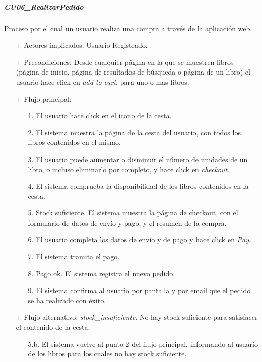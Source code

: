 \documentclass[a4paper]{article}
\begin{document}
            \subparagraph{CU06\_RealizarPedido}
                Proceso por el cual un usuario realiza una compra a través de la aplicación web.
                \begin{itemize}
                    \item[+] Actores implicados: Usuario Registrado.
                    \item[+] Precondiciones: Desde cualquier página en la que se muestren libros (página de inicio, página de resultados de búsqueda o página de un libro) el usuario hace click en \emph{add to cart}, para uno o mas libros.
                    \item[+] Flujo principal:
                    \begin{enumerate}
                        \item[1.] El usuario hace click en el icono de la cesta.
                        \item[2.] El sistema muestra la página de la cesta del usuario, con todos los libros contenidos en el mismo.
                        \item[3.] El usuario puede aumentar o disminuir el número de unidades de un libro, o incluso eliminarlo por completo, y hace click en \emph{checkout}.
                        \item[4.] El sistema comprueba la disponibilidad de los libros contenidos en la cesta.
                        \item[5.] Stock suficiente. El sistema muestra la página de checkout, con el formulario de datos de envío y pago, y el resumen de la compra.
                        \item[6.] El usuario completa los datos de envío y de pago y hace click en \emph{Pay}.
                        \item[7.] El sistema tramita el pago.
                        \item[8.] Pago ok. El sistema registra el nuevo pedido.
                        \item[9.] El sistema confirma al usuario por pantalla y por email que el pedido se ha realizado con éxito.
                    \end{enumerate}
                    \item[+] Flujo alternativo: \emph{stock\_insuficiente}. No hay stock suficiente para satisfacer el contenido de la cesta.
                    \begin{itemize}
                        \item[5.b.] El sistema vuelve al punto 2 del flujo principal, informando al usuario de los libros para los cuales no hay stock suficiente.

\end{itemize}
\end{itemize}
\end{document}

